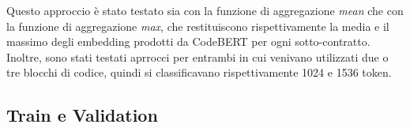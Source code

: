 \documentclass[../../Thesis.tex]{subfiles}
\begin{document}
Questo approccio è stato testato sia con la funzione di aggregazione \emph{mean} che con la funzione di aggregazione \emph{max}, che restituiscono rispettivamente la media e il massimo degli embedding prodotti da CodeBERT per ogni sotto-contratto. Inoltre, sono stati testati aprrocci per entrambi in cui venivano utilizzati due o tre blocchi di codice, quindi si classificavano rispettivamente 1024 e 1536 token.

\subsection{Train e Validation}
\end{document}
